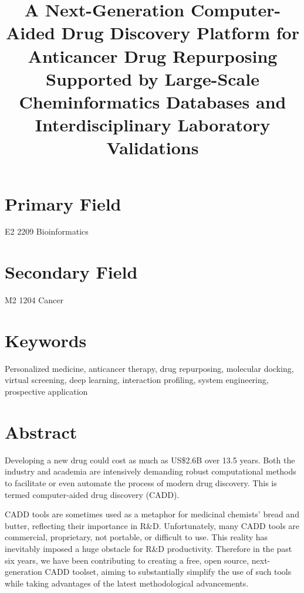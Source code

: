 \documentclass[a4paper,12pt]{article}
\begin{document}
\title{A Next-­Generation Computer­-Aided Drug Discovery Platform for Anticancer Drug Repurposing Supported by Large-­Scale Cheminformatics Databases and Interdisciplinary Laboratory Validations}
\maketitle

\section*{Primary Field}

E2 2209 Bioinformatics

\section*{Secondary Field}

M2 1204 Cancer

\section*{Keywords}

Personalized medicine, anticancer therapy, drug repurposing, molecular docking, virtual screening, deep learning, interaction profiling, system engineering, prospective application

\section*{Abstract}

Developing a new drug could cost as much as US\$2.6B over 13.5 years. Both the industry and academia are intensively demanding robust computational methods to facilitate or even automate the process of modern drug discovery. This is termed computer-aided drug discovery (CADD).

CADD tools are sometimes used as a metaphor for medicinal chemists' bread and butter, reflecting their importance in R\&D. Unfortunately, many CADD tools are commercial, proprietary, not portable, or difficult to use. This reality has inevitably imposed a huge obstacle for R\&D productivity. Therefore in the past six years, we have been contributing to creating a free, open source, next-generation CADD toolset, aiming to substantially simplify the use of such tools while taking advantages of the latest methodological advancements.
\end{document}
